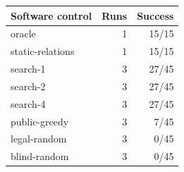 \begin{tabular}{lrr}\toprule
Software control & Runs & Success \\\midrule
oracle & 1 & 15/15 \\
static-relations & 1 & 15/15 \\
search-1 & 3 & 27/45 \\
search-2 & 3 & 27/45 \\
search-4 & 3 & 27/45 \\
public-greedy & 3 & 7/45 \\
legal-random & 3 & 0/45 \\
blind-random & 3 & 0/45 \\
\bottomrule\end{tabular}
